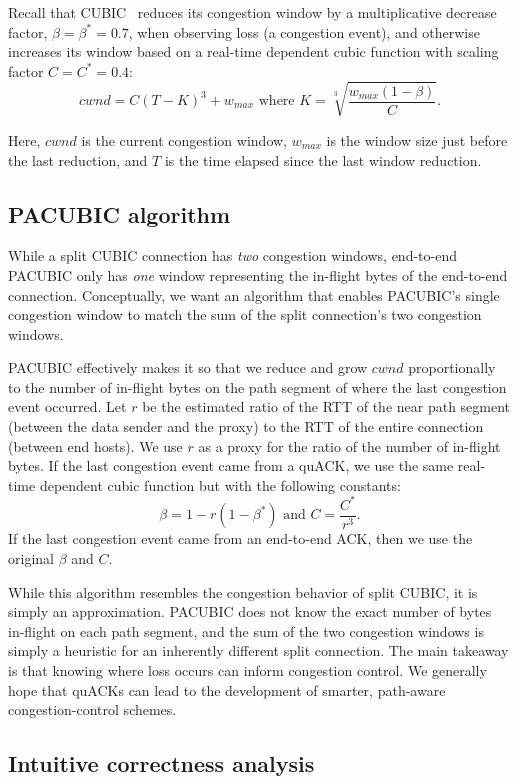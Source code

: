 Recall that CUBIC~\cite{ha2008cubic} reduces its congestion window by a
multiplicative decrease factor,
$\beta = \beta^* = 0.7$, when observing loss (a congestion event), and otherwise
increases its window based on a real-time dependent cubic function with scaling
factor $C=C^*=0.4$:
\[
cwnd = C(T-K)^3 + w_{max} \text{ where } K = \sqrt[3]{\frac{w_{max}(1-\beta)}{C}}.
\]

\noindent Here, $cwnd$ is the current congestion window,
$w_{max}$ is the window size just before the last reduction,
and $T$ is the time elapsed since the last window reduction.

\subsection{PACUBIC algorithm}

While a split CUBIC connection has \emph{two} congestion windows,
end-to-end PACUBIC only has \emph{one} window representing the in-flight bytes
of the end-to-end connection.
Conceptually, we want an algorithm that enables PACUBIC's single
congestion window to match the sum of the split connection's two congestion
windows.

PACUBIC effectively makes it so that we reduce and grow $cwnd$
proportionally to the number of in-flight bytes on the path segment
of where the last congestion event occurred.
Let $r$ be the estimated ratio of the RTT of the near path segment
(between the data sender and the proxy) to the RTT of the entire connection
(between end hosts).
We use $r$ as a proxy for the ratio of the number of in-flight bytes. If the
last congestion event came from a quACK, we use the same real-time dependent
cubic function but with the following constants:
\[
\beta = 1 - r(1-\beta^*)\text{ and }C = \frac{C^*}{r^3}.
\]
\noindent If the last congestion event came from an end-to-end ACK, then we use
the original $\beta$ and $C$.

While this algorithm resembles the congestion behavior of split CUBIC, it is
simply an approximation. PACUBIC does not know the exact number of bytes
in-flight on each path segment, and the sum of the two congestion windows is
simply a heuristic for an inherently different split connection. The main
takeaway is that knowing where loss occurs can inform congestion control. We
generally hope that quACKs can lead to the development of smarter, path-aware
congestion-control schemes.

\subsection{Intuitive correctness analysis}
\label{sec:sidekick:pacubic:analysis}

